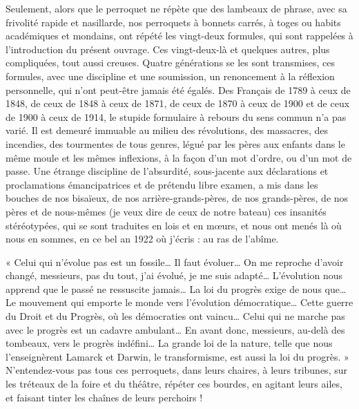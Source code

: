 \documentclass[french,twoside]{book} %
\begin{document}
Seulement, alors que le perroquet ne répète que des lambeaux de phrase, avec sa frivolité rapide et nasillarde, nos perroquets à bonnets carrés, à toges ou habits académiques et mondains, ont répété les vingt-deux formules, qui sont rappelées à l’introduction du présent ouvrage. Ces vingt-deux-là et quelques autres, plus compliquées, tout aussi creuses. Quatre générations se les sont transmises, ces formules, avec une discipline et une soumission, un renoncement à la réflexion personnelle, qui n’ont peut-être jamais été égalés. Des Français de 1789 à ceux de 1848, de ceux de 1848 à ceux de 1871, de ceux de 1870 à ceux de 1900 et de ceux de 1900 à ceux de 1914, le stupide formulaire à rebours du sens commun n’a pas varié. Il est demeuré immuable au milieu des révolutions, des massacres, des incendies, des tourmentes de tous genres, légué par les pères aux enfants dans le même moule et les mêmes inflexions, à la façon d’un mot d’ordre, ou d’un mot de passe. Une étrange discipline de l’absurdité, sous-jacente aux déclarations et proclamations émancipatrices et de prétendu libre examen, a mis dans les bouches de nos bisaïeux, de nos arrière-grands-pères, de nos grands-pères, de nos pères et de nous-mêmes (je veux dire de ceux de notre bateau) ces insanités stéréotypées, qui se sont traduites en lois et en mœurs, et nous ont menés là où nous en sommes, en ce bel an 1922 où j’écris : au ras de l’abîme.\par
« Celui qui n’évolue pas est un fossile… Il faut évoluer… On me reproche d’avoir changé, messieurs, pas du tout, j’ai évolué, je me suis adapté… L’évolution nous apprend que le passé ne ressuscite jamais… La loi du progrès exige de nous que… Le mouvement qui emporte le monde vers l’évolution démocratique… Cette guerre du Droit et du Progrès, où les démocraties ont vaincu… Celui qui ne marche pas avec le progrès est un cadavre ambulant… En avant donc, messieurs, au-delà des tombeaux, vers le progrès indéfini… La grande loi de la nature, telle que nous l’enseignèrent Lamarck et Darwin, le transformisme, est aussi la loi du progrès. » N’entendez-vous pas tous ces perroquets, dans leurs chaires, à leurs tribunes, sur les tréteaux de la foire et du théâtre, répéter ces bourdes, en agitant leurs ailes, et faisant tinter les chaînes de leurs perchoirs !\par
\end{document}
